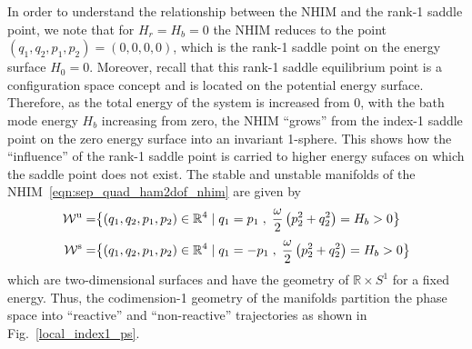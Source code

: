 \documentclass{ws-ijbc}
\begin{document}
In order to understand the relationship between the NHIM and the rank-1 saddle point, we note that for $H_r = H_b =0$ the NHIM reduces to the point $(q_1,q_2,p_1,p_2) = (0, 0, 0, 0)$, which is the rank-1 saddle point on the energy surface $H_0 = 0$. Moreover, recall that this rank-1 saddle equilibrium point is a configuration space concept and is located on the potential energy surface. Therefore, as the total energy of the system is increased from $0$, with the bath mode energy $H_b$ increasing from zero, the NHIM ``grows'' from the index-1 saddle point on the zero energy surface into an invariant 1-sphere. This shows how the ``influence'' of the rank-1 saddle point is carried to higher energy sufaces on which the saddle point does not exist. The stable and unstable manifolds of the NHIM~\eqref{eqn:sep_quad_ham2dof_nhim} are given by 
\begin{align}
\mathcal{W}^{\rm u} =& \big\{(q_1,q_2,p_1,p_2) \in \mathbb{R}^4 \; | \; q_1 = p_1 \; , \; \frac{\omega}{2}\left( p_2^2 + q_2^2 
\right) = H_b > 0  \big\} \label{eqn:quad_ham2dof_umani} \\[.1cm]
\mathcal{W}^{\rm s} =& \big\{(q_1,q_2,p_1,p_2) \in \mathbb{R}^4 \; | \; q_1 = - p_1 \; , \; \frac{\omega}{2}\left( p_2^2 + q_2^2 
\right) = H_b > 0  \big\} \label{eqn:quad_ham2dof_smani}
\end{align}
which are two-dimensional surfaces and have the geometry of $\mathbb{R} \times S^1$ for a fixed energy. Thus, the codimension-1 geometry of the manifolds partition the phase space into ``reactive'' and ``non-reactive'' trajectories as shown in Fig.~\ref{local_index1_ps}.
\end{document}
